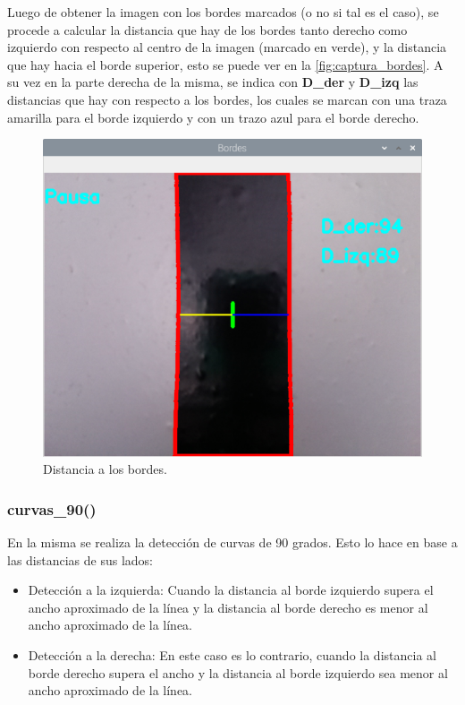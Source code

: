 \documentclass[11pt,a4paper]{article}
\begin{document}
	Luego de obtener la imagen con los bordes marcados (o no si tal es el caso), se procede a calcular la distancia que hay de los bordes tanto derecho como izquierdo con respecto al centro de la imagen (marcado en verde), y la distancia que hay hacia el borde superior, esto se puede ver en la \autoref*{fig:captura_bordes}. A su vez en la parte derecha de la misma, se indica con \textbf{D\_der} y \textbf{D\_izq} las distancias que hay con respecto a los bordes, los cuales se marcan con una traza amarilla para el borde izquierdo y con un trazo azul para el borde derecho.
	
	\begin{figure}[h!]
		\centering
		\includegraphics[width=0.7\linewidth]{imagenes/captura_bordes.png}
		\caption{Distancia a los bordes.}
		\label{fig:captura_bordes}
	\end{figure}
	
	\subsubsection{curvas\_90()}
	En la misma se realiza la detección de curvas de 90 grados. Esto lo hace en base a las distancias de sus lados:
	
	\begin{itemize}
		\item Detección a la izquierda: Cuando la distancia al borde izquierdo supera el ancho aproximado de la línea y la distancia al borde derecho es menor al ancho aproximado de la línea.
		\item Detección a la derecha: En este caso es lo contrario, cuando la distancia al borde derecho supera el ancho y la distancia al borde izquierdo sea menor al ancho aproximado de la línea.
	\end{itemize}
	
\end{document}
